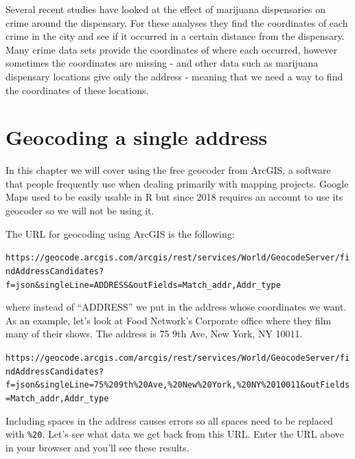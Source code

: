 \documentclass[
  12pt,
  openany]{book}
\begin{document}
Several recent studies have looked at the effect of marijuana dispensaries on crime around the dispensary. For these analyses they find the coordinates of each crime in the city and see if it occurred in a certain distance from the dispensary. Many crime data sets provide the coordinates of where each occurred, however sometimes the coordinates are missing - and other data such as marijuana dispensary locations give only the address - meaning that we need a way to find the coordinates of these locations.

\hypertarget{geocoding-a-single-address}{%
\section{Geocoding a single address}\label{geocoding-a-single-address}}

In this chapter we will cover using the free geocoder from ArcGIS, a software that people frequently use when dealing primarily with mapping projects. Google Maps used to be easily usable in R but since 2018 requires an account to use its geocoder so we will not be using it.

The URL for geocoding using ArcGIS is the following:

\texttt{https://geocode.arcgis.com/arcgis/rest/services/World/GeocodeServer/findAddressCandidates?f=json\&singleLine=ADDRESS\&outFields=Match\_addr,Addr\_type}

where instead of ``ADDRESS'' we put in the address whose coordinates we want. As an example, let's look at Food Network's Corporate office where they film many of their shows. The address is 75 9th Ave, New York, NY 10011.

\texttt{https://geocode.arcgis.com/arcgis/rest/services/World/GeocodeServer/findAddressCandidates?f=json\&singleLine=75\%209th\%20Ave,\%20New\%20York,\%20NY\%2010011\&outFields=Match\_addr,Addr\_type}

Including spaces in the address causes errors so all spaces need to be replaced with \texttt{\%20}. Let's see what data we get back from this URL. Enter the URL above in your browser and you'll see these results.
\end{document}
